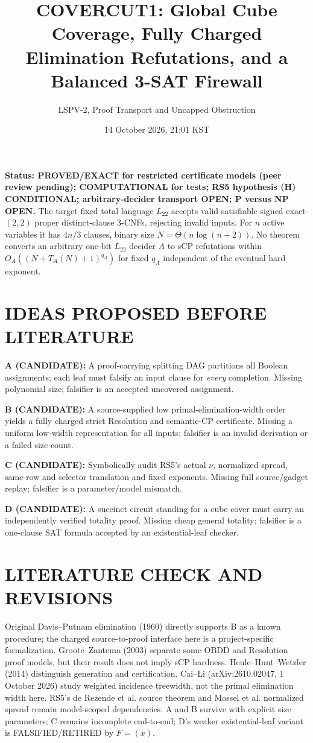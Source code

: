 \documentclass[11pt]{article}
\title{COVERCUT1: Global Cube Coverage, Fully Charged Elimination Refutations, and a Balanced 3-SAT Firewall}
\author{LSPV-2, Proof Transport and Uncapped Obstruction}
\date{14 October 2026, 21:01 KST}
\begin{document}
\maketitle
\noindent\textbf{Status: PROVED/EXACT for restricted certificate models (peer review pending); COMPUTATIONAL for tests; RS5 hypothesis (H) CONDITIONAL; arbitrary-decider transport OPEN; P versus NP OPEN.}
The target fixed total language $L_{22}$ accepts valid satisfiable signed exact-$(2,2)$ proper distinct-clause 3-CNFs, rejecting invalid inputs. For $n$ active variables it has $4n/3$ clauses, binary size $N=\Theta(n\log(n+2))$. No theorem converts an arbitrary one-bit $L_{22}$ decider $A$ to sCP refutations within $O_A((N+T_A(N)+1)^{q_A})$ for fixed $q_A$ independent of the eventual hard exponent.
\section{IDEAS PROPOSED BEFORE LITERATURE}
\noindent\textbf{A (CANDIDATE):} A proof-carrying splitting DAG partitions all Boolean assignments; each leaf must falsify an input clause for \emph{every} completion. Missing polynomial size; falsifier is an accepted uncovered assignment.
\par\noindent\textbf{B (CANDIDATE):} A source-supplied low primal-elimination-width order yields a fully charged strict Resolution and semantic-CP certificate. Missing a uniform low-width representation for all inputs; falsifier is an invalid derivation or a failed size count.
\par\noindent\textbf{C (CANDIDATE):} Symbolically audit RS5's actual $\nu$, normalized spread, same-row and selector translation and fixed exponents. Missing full source/gadget replay; falsifier is a parameter/model mismatch.
\par\noindent\textbf{D (CANDIDATE):} A succinct circuit standing for a cube cover must carry an independently verified totality proof. Missing cheap general totality; falsifier is a one-clause SAT formula accepted by an existential-leaf checker.
\section{LITERATURE CHECK AND REVISIONS}
Original Davis--Putnam elimination (1960) directly supports B as a known procedure; the charged source-to-proof interface here is a project-specific formalization. Groote--Zantema (2003) separate some OBDD and Resolution proof models, but their result does not imply sCP hardness. Heule--Hunt--Wetzler (2014) distinguish generation and certification. Cai--Li (arXiv:2610.02047, 1 October 2026) study weighted incidence treewidth, not the primal elimination width here. RS5's de Rezende et al. source theorem and Mossel et al. normalized spread remain model-scoped dependencies. A and B survive with explicit size parameters; C remains incomplete end-to-end; D's weaker existential-leaf variant is FALSIFIED/RETIRED by $F=(x)$.
\end{document}
